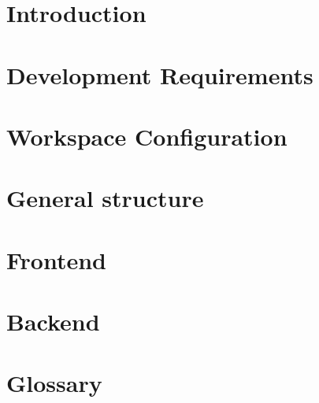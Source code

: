 \documentclass[a4paper, oneside, openany, dvipsnames, table]{article}
\begin{document}
\copertina{}
\newpage

\newpage
\tableofcontents
\newpage
\listoffigures
\newpage

\newpage
\newpage
\section{Introduction}
	

\newpage
\section{Development Requirements}


\newpage
\section{Workspace Configuration}



\section{General structure}


\newpage
\section{Frontend} %



\newpage
\section{Backend}


\newpage

\appendix
{}

\newpage
\section{Glossary}

\end{document}
